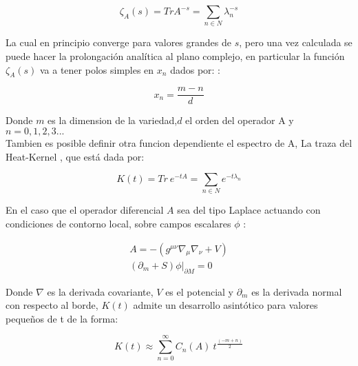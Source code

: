 \begin{equation}
\zeta _A (s) = Tr A ^{-s} = \sum _{n \in N}  \lambda _n ^{-s}
\label{funcion.zeta}
\end{equation}

La cual en principio converge para valores grandes de $s$, pero una vez calculada se puede hacer la prolongación analítica al plano complejo, en particular la función $\zeta _A (s)$ va a tener polos simples en $x _n$ dados por:   :

\begin{equation}
x _n = \frac{m-n}{d} 
\label{eq.ceros.zeta}
\end{equation}

Donde $m$ es la dimension de la variedad,$d$ el orden del operador A y $n= 0,1,2,3 ...$ \\

Tambien es posible definir otra funcion dependiente el espectro de A, La traza del Heat-Kernel \cite{VASSILEVICH2003279}, que está dada por:

\begin{equation}
K (t) =  Tr \ e ^{-t A} = 
\sum _{n  \in N} e ^{-t \lambda _{n} }
\end{equation}

En el caso que el operador diferencial $A$ sea del tipo Laplace actuando con condiciones de contorno local, sobre campos escalares $\phi $ :

\begin{equation}
\begin{array}{c}

A = - \left(
			g ^{\mu \nu} \nabla _{\mu} \nabla _{\nu} + V
			\right) \\
\left (\partial _m + S \right) \phi | _{\partial M} = 0

			

\end{array}
\end{equation}

Donde $\nabla$ es la derivada covariante, $V$ es el potencial y $\partial _m$ es la derivada normal con respecto al borde, $K(t)$ admite un desarrollo asintótico para valores pequeños de t  de la forma:

\begin{equation}
K(t) \approx 
\sum _{n=0} ^{\infty}
C _n (A) \ 
t ^{\frac{(-m+n)}{2}}
\label{eq.heat.expansion}
\end{equation}



